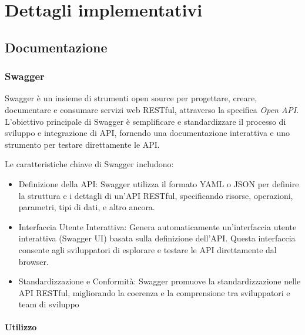 \section{Dettagli implementativi}



\subsection{Documentazione}

%
%
%
\subsubsection{Swagger}
Swagger è un insieme di strumenti open source per progettare, creare, documentare e consumare servizi web RESTful, attraverso la specifica \emph{Open API}.
%
L'obiettivo principale di Swagger è semplificare e standardizzare il processo di sviluppo e integrazione di API, fornendo una documentazione interattiva e uno strumento per testare direttamente le API.

Le caratteristiche chiave di Swagger includono:

\begin{itemize}
    \item Definizione della API: Swagger utilizza il formato YAML o JSON per definire la struttura e i dettagli di un'API RESTful, specificando risorse, operazioni, parametri, tipi di dati, e altro ancora.
    
    \item Interfaccia Utente Interattiva: Genera automaticamente un'interfaccia utente interattiva (Swagger UI) basata sulla definizione dell'API. Questa interfaccia consente agli sviluppatori di esplorare e testare le API direttamente dal browser.

    \item Standardizzazione e Conformità: Swagger promuove la standardizzazione nelle API RESTful, migliorando la coerenza e la comprensione tra sviluppatori e team di sviluppo
\end{itemize}

%
%
%
\paragraph{Utilizzo}

